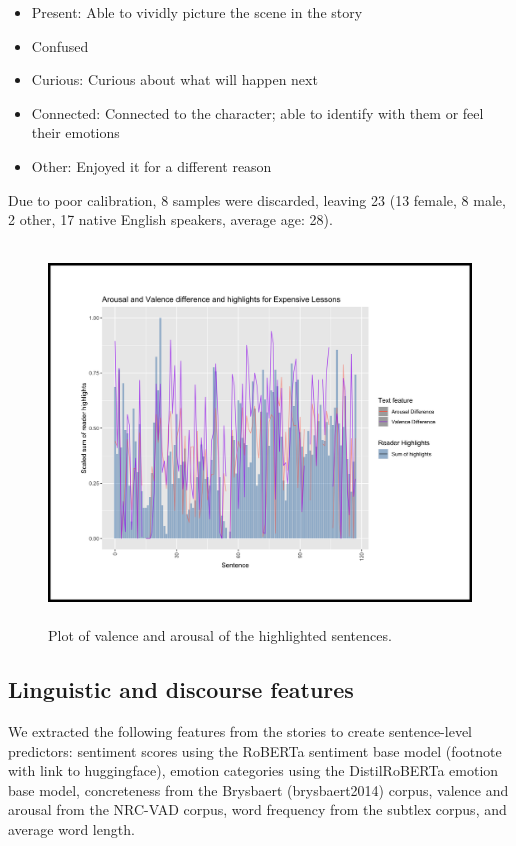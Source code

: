 \documentclass[11pt]{article}
\begin{document}
\begin{itemize}
  \item Present: Able to vividly picture the scene in the story
  \item Confused
  \item Curious: Curious about what will happen next
  \item Connected: Connected to the character; able to identify with them or feel their emotions
  \item Other: Enjoyed it for a different reason
\end{itemize}

Due to poor calibration, 8 samples were discarded, leaving 23 (13 female, 8 male, 2 other, 17 native English speakers, average age: 28).
\begin{figure}
  \includegraphics[width=\textwidth,height=10cm]{el_highlights_val_arousal}
  \caption{Plot of valence and arousal of the highlighted sentences.}
\end{figure}

\subsection{Linguistic and discourse features}

We extracted the following features from the stories to create sentence-level predictors: sentiment scores using the RoBERTa sentiment base model (footnote with link to huggingface), emotion categories using the DistilRoBERTa emotion base model, concreteness from the Brysbaert (brysbaert2014) corpus, valence and arousal from the NRC-VAD corpus, word frequency from the subtlex corpus, and average word length.
\end{document}
